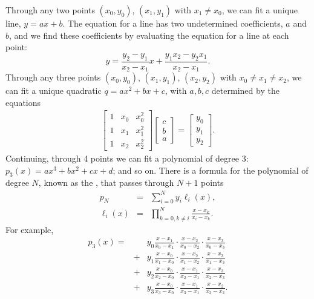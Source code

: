 \begin{sidebar}[Interpolation]
\label{sb.interpolation}
Through any two points $(x_{0},y_{0})$, $(x_{1},y_{1})$ with $x_{1}\neq x_{0}$, we can fit a unique line, $y=ax+b$. The equation for a line has two undetermined coefficients, $a$ and $b$, and we find these coefficients by evaluating the equation for a line at each point:
\[
	y =  \frac{y_{2}-y_{1}}{x_{2}-x_{1}} x + \frac{y_{1}x_{2} - y_{2}x_{1}}{x_{2}-x_{1}}.
\]
Through any three points $(x_{0},y_{0})$, $(x_{1},y_{1})$, $(x_{2},y_{2})$ with $x_{0}\neq x_{1}\neq x_{2}$, we can fit a unique quadratic $q = ax^{2}+bx+c$, with $a,b,c$ determined by the equations
\begin{eqnarray*}
\left[\begin{array}{rrr}
1 & x_{0} & x_{0}^{2} \\
1 & x_{1} & x_{1}^{2} \\
1 & x_{2} & x_{2}^{2}
\end{array}\right] \left[\begin{array}{c} c\\b\\a\end{array}\right] = 
\left[\begin{array}{c} y_{0}\\y_{1}\\y_{2}\end{array}\right].
\end{eqnarray*}
Continuing, through 4 points we can fit a polynomial of degree 3: $p_{3}(x) = ax^{3} + bx^{2} + cx +d$; and so on. There is a formula for the polynomial of degree $N$, known as the , that passes through $N+1$ points
\begin{eqnarray}
p_{N} &=& \sum_{i=0}^{N} y_{i}\ell_{i}(x),\\
\ell_{i}(x) &=& \prod_{k=0,k\neq i}^{N} \frac{x-x_{k}}{x_{i}-x_{k}}.
\end{eqnarray}
For example,
\begin{eqnarray}
p_{3}(x) =&&  y_{0}\frac{x-x_{1}}{x_{0}-x_{1}}\cdot\frac{x-x_{2}}{x_{0}-x_{2}}\cdot\frac{x-x_{3}}{x_{0}-x_{3}} \nonumber\\
      &+& y_{1}\frac{x-x_{0}}{x_{1}-x_{0}}\cdot\frac{x-x_{2}}{x_{1}-x_{2}}\cdot\frac{x-x_{3}}{x_{1}-x_{3}} \nonumber \\
      &+& y_{2}\frac{x-x_{0}}{x_{2}-x_{0}}\cdot\frac{x-x_{1}}{x_{2}-x_{1}}\cdot\frac{x-x_{3}}{x_{2}-x_{3}} \nonumber\\
      &+& y_{3}\frac{x-x_{0}}{x_{3}-x_{0}}\cdot\frac{x-x_{1}}{x_{3}-x_{1}}\cdot\frac{x-x_{2}}{x_{3}-x_{2}}.
\label{e.four-points}
\end{eqnarray}
\end{sidebar}

